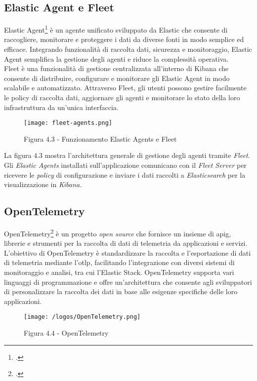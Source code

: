 \subsection*{Elastic Agent e Fleet}
Elastic Agent\footcite{site:elastic-agent} è un agente unificato sviluppato da Elastic che consente di raccogliere, monitorare e proteggere i dati da diverse fonti in modo semplice ed efficace. Integrando funzionalità di raccolta dati, sicurezza e monitoraggio, Elastic Agent semplifica la gestione degli agenti e riduce la complessità operativa. \\
Fleet è una funzionalità di gestione centralizzata all'interno di Kibana che consente di distribuire, configurare e monitorare gli Elastic Agent in modo scalabile e automatizzato. Attraverso Fleet, gli utenti possono gestire facilmente le policy di raccolta dati, aggiornare gli agenti e monitorare lo stato della loro infrastruttura da un'unica interfaccia.
\begin{figure}[H] 
    \centering 
    \texttt{[image: fleet-agents.png]} 
    \caption{Figura 4.3 - Funzionamento Elastic Agents e Fleet}
\end{figure}
La figura 4.3 mostra l'architettura generale di gestione degli agenti tramite \emph{Fleet}. Gli \emph{Elastic Agents} installati sull'applicazione comunicano con il \emph{Fleet Server} per ricevere le \emph{policy} di configurazione e inviare i dati raccolti a \emph{Elasticsearch} per la visualizzazione in \emph{Kibana}.   
\vspace{1em}

\subsection*{OpenTelemetry}
OpenTelemetry\footcite{site:opentelemetry} è un progetto \emph{open source} che fornisce un insieme di \gls{apig}, librerie e strumenti per la raccolta di dati di telemetria da applicazioni e servizi. L'obiettivo di OpenTelemetry è standardizzare la raccolta e l'esportazione di dati di telemetria mediante l'\gls{otlp}, facilitando l'integrazione con diversi sistemi di monitoraggio e analisi, tra cui l'Elastic Stack. OpenTelemetry supporta vari linguaggi di programmazione e offre un'architettura che consente agli sviluppatori di personalizzare la raccolta dei dati in base alle esigenze specifiche delle loro applicazioni.
\begin{figure}[H] 
    \centering 
    \texttt{[image: /logos/OpenTelemetry.png]} 
    \caption{Figura 4.4 - OpenTelemetry}
\end{figure}

